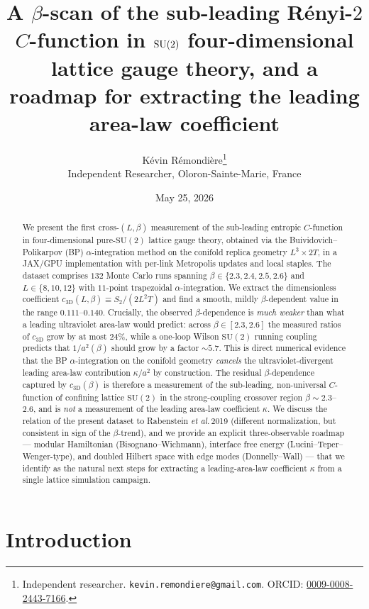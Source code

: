 \documentclass[11pt,a4paper]{article}
\title{A $\beta$-scan of the sub-leading Rényi-$2$ $C$-function in $\SUtwo$
       four-dimensional lattice gauge theory, and a roadmap for
       extracting the leading area-law coefficient}
\author{K\'evin R\'emondi\`ere\thanks{Independent researcher.
        \texttt{kevin.remondiere@gmail.com}.
        ORCID: \href{https://orcid.org/0009-0008-2443-7166}{0009-0008-2443-7166}.}\\
        \small Independent Researcher, Oloron-Sainte-Marie, France}
\date{May 25, 2026}
\theoremstyle{definition}
\newcommand{\SUtwo}{\mathrm{SU}(2)}
\newcommand{\threeD}{{3\text{D}}}
\begin{document}
\maketitle

\begin{abstract}
We present the first cross-$(L,\beta)$ measurement of the sub-leading
entropic $C$-function in four-dimensional pure-$\SUtwo$ lattice gauge
theory, obtained via the Buividovich--Polikarpov (BP)
$\alpha$-integration method
\cite{BP2008b,Rabenstein2019,Rindlisbacher2022} on the conifold
replica geometry $L^{3}\times 2T$, in a JAX/GPU implementation with
per-link Metropolis updates and local staples. The dataset comprises
$132$ Monte Carlo runs spanning $\beta\in\{2.3,2.4,2.5,2.6\}$ and
$L\in\{8,10,12\}$ with $11$-point trapezoidal $\alpha$-integration.
We extract the dimensionless coefficient $c_{\threeD}(L,\beta)\equiv
S_{2}/(2 L^{2} T)$ and find a smooth, mildly $\beta$-dependent value
in the range $0.111$--$0.140$. Crucially, the observed
$\beta$-dependence is \emph{much weaker} than what a leading
ultraviolet area-law would predict: across $\beta\in[2.3,2.6]$ the
measured ratios of $c_{\threeD}$ grow by at most $24\%$, while a
one-loop Wilson $\SUtwo$ running coupling predicts that $1/a^{2}(\beta)$
should grow by a factor $\sim 5.7$. This is direct numerical evidence
that the BP $\alpha$-integration on the conifold geometry
\emph{cancels} the ultraviolet-divergent leading area-law contribution
$\kappa/a^{2}$ by construction. The residual $\beta$-dependence
captured by $c_{\threeD}(\beta)$ is therefore a measurement of the
sub-leading, non-universal $C$-function of confining lattice $\SUtwo$
in the strong-coupling crossover region $\beta\!\sim\!2.3$--$2.6$, and
is \emph{not} a measurement of the leading area-law coefficient
$\kappa$. We discuss the relation of the present dataset to
Rabenstein \emph{et al.}\,2019 \cite{Rabenstein2019} (different
normalization, but consistent in sign of the $\beta$-trend), and we
provide an explicit three-observable roadmap --- modular Hamiltonian
(Bisognano--Wichmann), interface free energy
(Lucini--Teper--Wenger-type), and doubled Hilbert space with edge
modes (Donnelly--Wall) --- that we identify as the natural next steps
for extracting a leading-area-law coefficient $\kappa$ from a single
lattice simulation campaign.
\end{abstract}

\tableofcontents


\section{Introduction}
\label{sec:intro}
\end{document}
